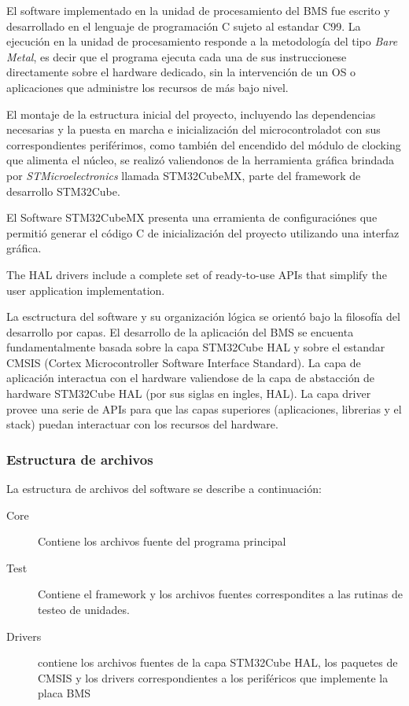 \documentclass[10pt,a4paper]{article}
\begin{document}
El software implementado en la unidad de procesamiento del \acrshort{BMS} fue
escrito y desarrollado en el lenguaje de programación C sujeto al estandar C99.
La ejecución en la unidad de procesamiento responde a la metodología del tipo
\emph{Bare Metal}, es decir que el programa ejecuta cada una de sus
instruccionese directamente sobre el hardware dedicado, sin la intervención de
un \acrfull{OS} o aplicaciones que administre los recursos de más bajo nivel.

El montaje de la estructura inicial del proyecto, incluyendo las dependencias
necesarias y la puesta en marcha e inicialización del microcontroladot con sus
correspondientes periférimos, como también del encendido del módulo de clocking
que alimenta el núcleo, se realizó valiendonos de la herramienta gráfica
brindada por \emph{STMicroelectronics} llamada STM32CubeMX, parte del framework
de desarrollo STM32Cube. 

El Software STM32CubeMX presenta una erramienta de configuraciónes que permitió
generar el código C de inicialización del proyecto utilizando una interfaz
gráfica. 

The HAL drivers include a complete set of
ready-to-use APIs that simplify the user application implementation. 

La esctructura del software y su organización lógica se orientó bajo la
filosofía del desarrollo por capas. El desarrollo de la aplicación del
\acrshort{BMS} se encuenta fundamentalmente basada sobre la capa STM32Cube HAL
y sobre el estandar CMSIS (Cortex Microcontroller Software Interface Standard).
La capa de aplicación interactua con el hardware valiendose de la capa de
abstacción de hardware STM32Cube \acrshort{ HAL } (por sus siglas en ingles,
\acrfull{HAL}). La capa driver  provee una serie de
\acrshort{API}s para que las capas superiores (aplicaciones, librerias y el
stack) puedan interactuar con los recursos del hardware.

\subsubsection{Estructura de archivos}

La estructura de archivos del software se describe a continuación:

\begin{description}
    \item [Core] Contiene los archivos fuente del programa principal
    \item [Test] Contiene el framework y los archivos fuentes correspondites a
        las rutinas de testeo de unidades.
    \item[Drivers] contiene los archivos fuentes de la capa STM32Cube HAL, los
        paquetes de CMSIS y los drivers correspondientes a los periféricos que
        implemente la placa \acrshort{BMS}
\end{description}
\end{document}
